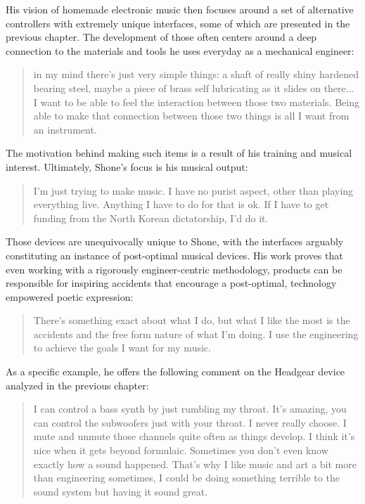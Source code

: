 His vision of homemade electronic music then focuses around a set of alternative controllers with extremely unique interfaces, some of which are presented in the previous chapter. The development of those often centers around a deep connection to the materials and tools he uses everyday as a mechanical engineer: 

\begin{quote}
	in my mind there’s just very simple things: a shaft of really shiny hardened bearing steel, maybe a piece of brass self lubricating as it slides on there... I want to be able to feel the interaction between those two materials. Being able to make that connection between those two things is all I want from an instrument.
\end{quote} 

The motivation behind making such items is a result of his training and musical interest. Ultimately, Shone's focus is his musical output: 

\begin{quote}
	
	I'm just trying to make music. I have no purist aspect, other than playing everything live. Anything I have to do for that is ok. If I have to get funding from the North Korean dictatorship, I'd do it.
	
	\end{quote}

Those devices are unequivocally unique to Shone, with the interfaces arguably constituting an instance of post-optimal musical devices. His work proves that even working with a rigorously engineer-centric methodology, products can be responsible for inspiring accidents that encourage a post-optimal, technology empowered poetic expression: 

\begin{quote}
	There's something exact about what I do, but what I like the most is the accidents and the free form nature of what I'm doing. I use the engineering to achieve the goals I want for my music.

	\end{quote}

As a specific example, he offers the following comment on the Headgear device analyzed in the previous chapter: 

\begin{quote}
	I can control a bass synth by just rumbling my throat. It’s amazing, you can control the subwoofers just with your throat. I never really choose. I mute and unmute those channels quite often as things develop. I think it’s nice when it gets beyond formulaic. Sometimes you don’t even know exactly how a sound happened. That’s why I like music and art a bit more than engineering sometimes, I could be doing something terrible to the sound system but having it sound great.
\end{quote}

